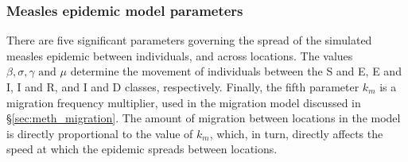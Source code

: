 \subsubsection{Measles epidemic model parameters}
There are five significant parameters governing the spread of the simulated measles epidemic between individuals, and across locations. The values $\beta, \sigma, \gamma \text{ and } \mu$ determine the movement of individuals between the S and E, E and I, I and R, and I and D classes, respectively. Finally, the fifth parameter $k_{m}$ is a migration frequency multiplier, used in the migration model discussed in \S \ref{sec:meth_migration}. The amount of migration between locations in the model is directly proportional to the value of $k_{m}$, which, in turn, directly affects the speed at which the epidemic spreads between locations.

